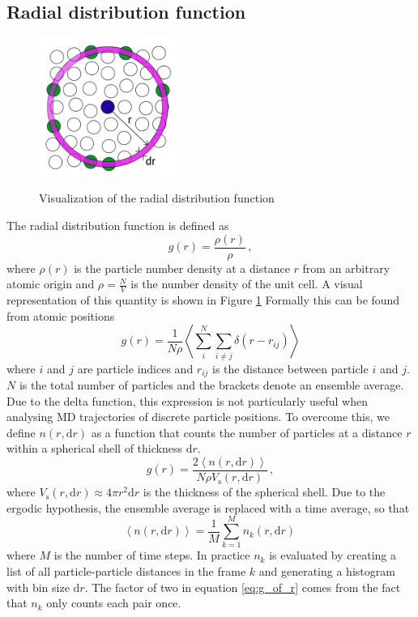 \subsection{Radial distribution function}

\begin{figure}
	\centering
	\includegraphics[width=0.4\textwidth]{fig/temp/gr.png}
	\label{fig:rdf}
	\caption[RDF visualization]{Visualization of the radial distribution function}
\end{figure}

The radial distribution function is defined as
%
\[ g(r) = \frac{\rho(r)}{\rho} \, , \]
%
where $\rho(r)$ is the particle number density at a distance $r$ from an arbitrary atomic origin and $\rho = \frac{N}{V}$ is the number density of the unit cell. A visual representation of this quantity is shown in Figure \ref{fig:rdf} Formally this can be found from atomic positions
%
\[ g(r) = \frac{1}{N\rho} \left\langle \sum_i^N \sum_{i \neq j} \delta(r - r_{ij})  \right\rangle \]
%
where $i$ and $j$ are particle indices and $r_{ij}$ is the distance between particle $i$ and $j$. $N$ is the total number of particles and the brackets denote an ensemble average. Due to the delta function, this expression is not particularly useful when analysing MD trajectories of discrete particle positions. To overcome this, we define $n(r,\mathrm{d}r)$ as a function that counts the number of particles at a distance $r$ within a spherical shell of thickness $\mathrm{d}r$.
%
\begin{equation}\label{eq:g_of_r}
g(r) = \frac{2 \left\langle n(r,\mathrm{d}r) \right\rangle}{N \rho V_\text{s}(r,\mathrm{d}r)} \, ,
\end{equation}
%
where $V_\text{s}(r,\mathrm{d}r) \approx 4 \pi r^2 \mathrm{d}r$ is the thickness of the spherical shell. Due to the ergodic hypothesis, the ensemble average is replaced with a time average, so that 
%
\[ \left\langle n(r,\mathrm{d}r) \right\rangle = \frac{1}{M} \sum_{k=1}^M n_k(r,\mathrm{d}r) \, \]
%
where $M$ is the number of time steps. In practice $n_k$ is evaluated by creating a list of all particle-particle distances in the frame $k$ and generating a histogram with bin size $\mathrm{d}r$. The factor of two in equation \eqref{eq:g_of_r} comes from the fact that $n_k$ only counts each pair once.

